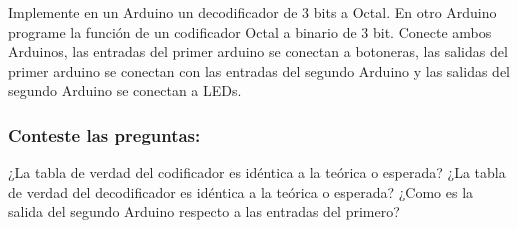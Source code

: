 Implemente en un Arduino un decodificador de 3 bits a Octal. En otro Arduino programe la función de un codificador Octal a binario de 3 bit. Conecte ambos Arduinos, las entradas del primer arduino se conectan a botoneras, las salidas del primer arduino se conectan con las entradas del segundo Arduino y las salidas del segundo Arduino se conectan a LEDs.  


\subsubsection{Conteste las preguntas:} 
¿La tabla de verdad del codificador es idéntica a la teórica o esperada?
¿La tabla de verdad del decodificador es idéntica a la teórica o esperada?
¿Como es la salida del segundo Arduino respecto a las entradas del primero?
